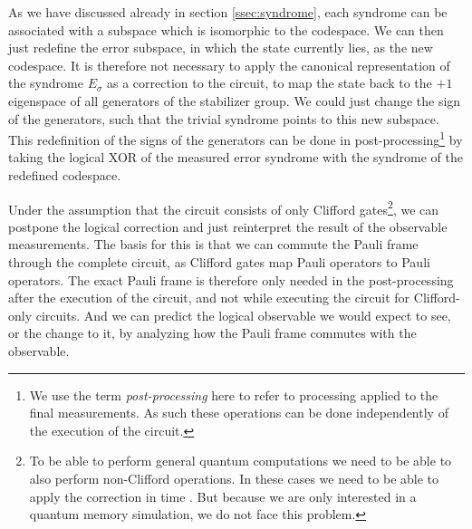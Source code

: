 As we have discussed already in section \ref{ssec:syndrome}, each syndrome can be associated with a subspace which is isomorphic to the codespace.
We can then just redefine the error subspace, in which the state currently lies, as the new codespace.
It is therefore not necessary to apply the canonical representation of the syndrome $E_\sigma$ as a correction to the circuit, to map the state back to the $+1$ eigenspace of all generators of the stabilizer group. 
We could just change the sign of the generators, such that the trivial syndrome points to this new subspace.
This redefinition of the signs of the generators can be done in post-processing\footnote{
    We use the term \emph{post-processing} here to refer to processing applied to the final measurements.
    As such these operations can be done independently of the execution of the circuit.
} by taking the logical XOR of the measured error syndrome with the syndrome of the redefined codespace.

Under the assumption that the circuit consists of only Clifford gates\footnote{
To be able to perform general quantum computations we need to be able to also perform non-Clifford operations. 
In these cases we need to be able to apply the correction in time \cite{terhal_qec_formalism}. 
But because we are only interested in a quantum memory simulation, we do not face this problem. 
}, we can postpone the logical correction and just reinterpret the result of the observable measurements.
The basis for this is that we can commute the Pauli frame through the complete circuit, as Clifford gates map Pauli operators to Pauli operators.
The exact Pauli frame is therefore only needed in the post-processing after the execution of the circuit, and not while executing the circuit for Clifford-only circuits.
And we can predict the logical observable we would expect to see, or the change to it, by analyzing how the Pauli frame commutes with the observable. 

